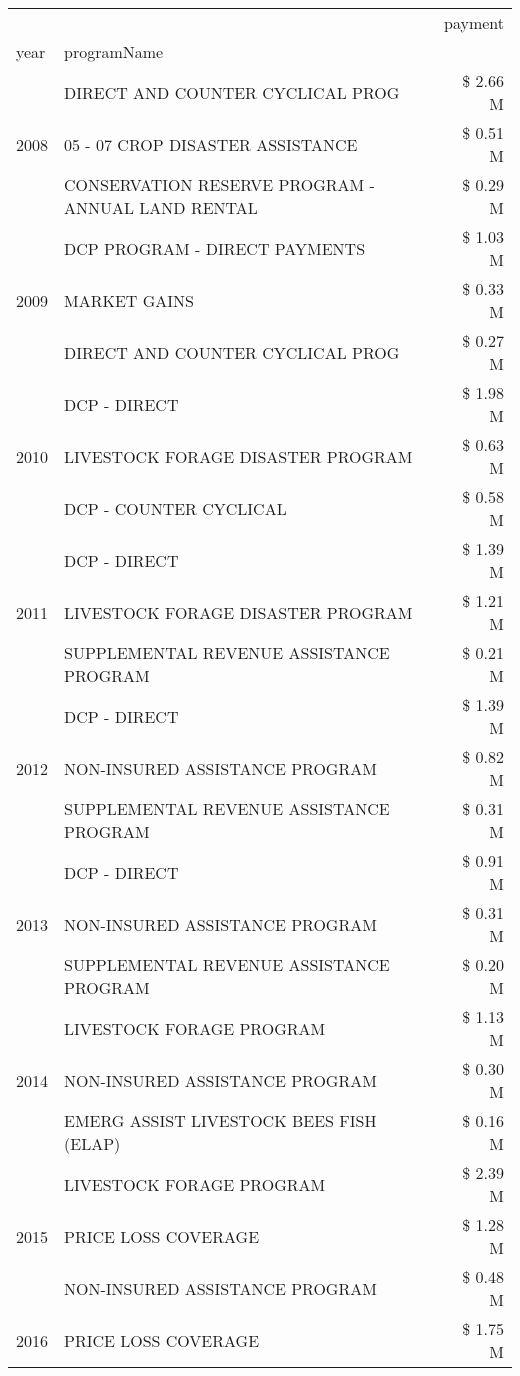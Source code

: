 \begin{tabular}{llr}
\toprule
 &  & payment \\
year & programName &  \\
\midrule
\multirow[t]{3}{*}{2008} & DIRECT AND COUNTER CYCLICAL PROG & \$ 2.66 M \\
 & 05 - 07 CROP DISASTER ASSISTANCE & \$ 0.51 M \\
 & CONSERVATION RESERVE PROGRAM - ANNUAL LAND RENTAL & \$ 0.29 M \\
\cline{1-3}
\multirow[t]{3}{*}{2009} & DCP PROGRAM - DIRECT PAYMENTS & \$ 1.03 M \\
 & MARKET GAINS & \$ 0.33 M \\
 & DIRECT AND COUNTER CYCLICAL PROG & \$ 0.27 M \\
\cline{1-3}
\multirow[t]{3}{*}{2010} & DCP - DIRECT & \$ 1.98 M \\
 & LIVESTOCK FORAGE DISASTER PROGRAM & \$ 0.63 M \\
 & DCP - COUNTER CYCLICAL & \$ 0.58 M \\
\cline{1-3}
\multirow[t]{3}{*}{2011} & DCP - DIRECT & \$ 1.39 M \\
 & LIVESTOCK FORAGE DISASTER PROGRAM & \$ 1.21 M \\
 & SUPPLEMENTAL REVENUE ASSISTANCE PROGRAM & \$ 0.21 M \\
\cline{1-3}
\multirow[t]{3}{*}{2012} & DCP - DIRECT & \$ 1.39 M \\
 & NON-INSURED ASSISTANCE PROGRAM & \$ 0.82 M \\
 & SUPPLEMENTAL REVENUE ASSISTANCE PROGRAM & \$ 0.31 M \\
\cline{1-3}
\multirow[t]{3}{*}{2013} & DCP - DIRECT & \$ 0.91 M \\
 & NON-INSURED ASSISTANCE PROGRAM & \$ 0.31 M \\
 & SUPPLEMENTAL REVENUE ASSISTANCE PROGRAM & \$ 0.20 M \\
\cline{1-3}
\multirow[t]{3}{*}{2014} & LIVESTOCK FORAGE PROGRAM & \$ 1.13 M \\
 & NON-INSURED ASSISTANCE PROGRAM & \$ 0.30 M \\
 & EMERG ASSIST LIVESTOCK BEES FISH (ELAP) & \$ 0.16 M \\
\cline{1-3}
\multirow[t]{3}{*}{2015} & LIVESTOCK FORAGE PROGRAM & \$ 2.39 M \\
 & PRICE LOSS COVERAGE & \$ 1.28 M \\
 & NON-INSURED ASSISTANCE PROGRAM & \$ 0.48 M \\
\cline{1-3}
\multirow[t]{3}{*}{2016} & PRICE LOSS COVERAGE & \$ 1.75 M \\

\end{tabular}
